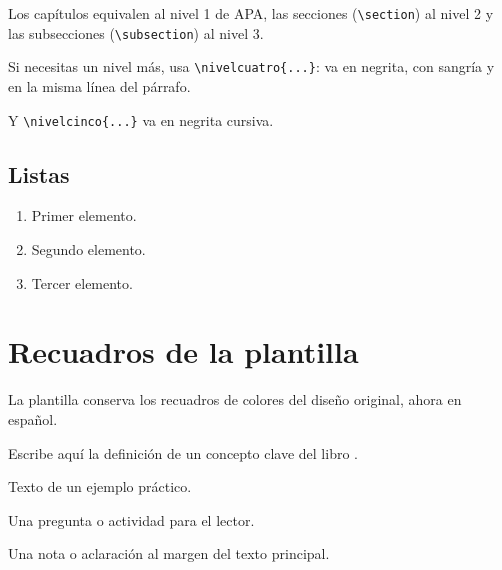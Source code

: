 Los capítulos equivalen al nivel 1 de APA, las secciones (\verb|\section|) al nivel 2 y las subsecciones (\verb|\subsection|) al nivel 3.

 Si necesitas un nivel más, usa \verb|\nivelcuatro{...}|: va en negrita, con sangría y en la misma línea del párrafo.

 Y \verb|\nivelcinco{...}| va en negrita cursiva.

\subsection{Listas}

\begin{enumerate}
\item Primer elemento.
\item Segundo elemento.
\item Tercer elemento.
\end{enumerate}


\section{Recuadros de la plantilla}

La plantilla conserva los recuadros de colores del diseño original, ahora en español.

\begin{definition}
Escribe aquí la definición de un concepto clave del libro \parencite{apellido2023}.
\end{definition}

\begin{example}
Texto de un ejemplo práctico.
\end{example}

\begin{exercise}
Una pregunta o actividad para el lector.
\end{exercise}

\begin{remark}
Una nota o aclaración al margen del texto principal.
\end{remark}
